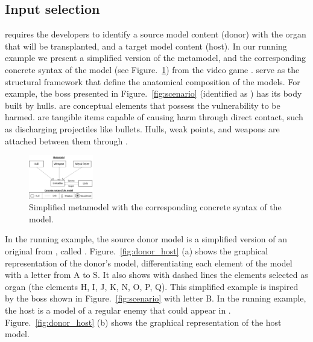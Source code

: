 \subsection{Input selection}

\ApproachName{} requires the developers to identify a source model content (donor) with the organ that will be transplanted, and a target model content (host). %
In our running example we present a simplified version of the metamodel, and the corresponding concrete syntax of the model (see Figure.~\ref{fig:metamodel+syntax}) from the video game \CaseStudy{}. 
 serve as the structural framework that define the anatomical composition of the models. For example, the boss presented in Figure.~\ref{fig:scenario} (identified as ) has its body built by hulls.
 are conceptual elements that possess the vulnerability to be harmed.
 are tangible items capable of causing harm through direct contact, such as discharging projectiles like bullets.
Hulls, weak points, and weapons are attached between them through .

\begin{figure}[tb]
    \centering
    \includegraphics[width=0.25\textwidth]{Figures/metamodel+syntax.png}
    \caption{Simplified metamodel with the corresponding concrete syntax of the model.}
    \label{fig:metamodel+syntax}
\end{figure}

In the running example, the source donor model is a simplified version of an original  from \CaseStudy{}, called . Figure.~\ref{fig:donor_host} (a) shows the graphical representation of the donor's model, differentiating each element of the model with a letter from A to S. It also shows with dashed lines the elements selected as organ (the elements H, I, J, K, N, O, P, Q).
This simplified example is inspired by the boss shown in Figure.~\ref{fig:scenario} with letter B. In the running example, the host is a model of a regular enemy that could appear in \CaseStudy{}. Figure.~\ref{fig:donor_host} (b) shows the graphical representation of the host model.

